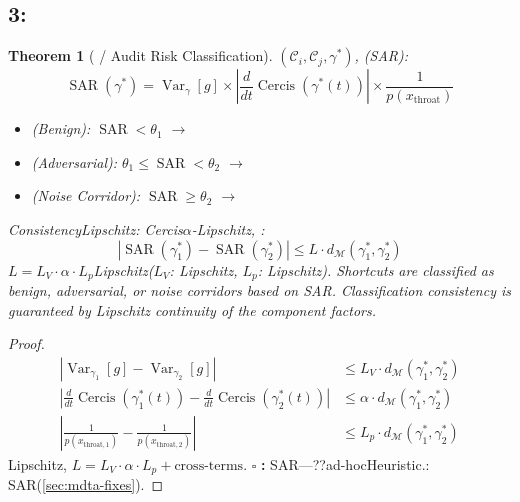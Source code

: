 \documentclass[11pt,a4paper]{article}
\theoremstyle{plain}
\newtheorem{theorem}{Theorem}[section]
\theoremstyle{definition}
\theoremstyle{remark}
\newcommand{\cM}{\mathcal{M}}
\newcommand{\cC}{\mathcal{C}}
\DeclareMathOperator{\Cercis}{Cercis}
\DeclareMathOperator{\Var}{Var}
\DeclareMathOperator{\SAR}{SAR}
\begin{document}
{\subsection{3:}
\begin{theorem}[ / Audit Risk Classification]
\label{thm:mdta-risk}
$(\cC_i, \cC_j, \gamma^*)$, (SAR): 
\begin{equation}
 \SAR(\gamma^*) = \Var_\gamma[g] \times \left|\frac{d}{dt} \Cercis(\gamma^*(t))\right| \times \frac{1}{p(x_{\text{throat}})}
\end{equation}
\begin{itemize}
 \item (Benign): $\SAR < \theta_1$ $\rightarrow$ 
 \item (Adversarial): $\theta_1 \leq \SAR < \theta_2$ $\rightarrow$ 
 \item (Noise Corridor): $\SAR \geq \theta_2$ $\rightarrow$ 
\end{itemize}
ConsistencyLipschitz: Cercis$\alpha$-Lipschitz, : 
\begin{equation}
\boxed{|\SAR(\gamma_1^*) - \SAR(\gamma_2^*)| \leq L \cdot d_{\cM}(\gamma_1^*, \gamma_2^*)}
\end{equation}
$L = L_V \cdot \alpha \cdot L_p$Lipschitz($L_V$: Lipschitz, $L_p$: Lipschitz).
\textit{Shortcuts are classified as benign, adversarial, or noise corridors based on SAR. Classification consistency is guaranteed by Lipschitz continuity of the component factors.}
\end{theorem}
\begin{proof}
\begin{align}
 |\Var_{\gamma_1}[g] - \Var_{\gamma_2}[g]| &\leq L_V \cdot d_{\cM}(\gamma_1^*, \gamma_2^*) \\
 \left|\frac{d}{dt}\Cercis(\gamma_1^*(t)) - \frac{d}{dt}\Cercis(\gamma_2^*(t))\right| &\leq \alpha \cdot d_{\cM}(\gamma_1^*, \gamma_2^*) \\
 \left|\frac{1}{p(x_{\text{throat},1})} - \frac{1}{p(x_{\text{throat},2})}\right| &\leq L_p \cdot d_{\cM}(\gamma_1^*, \gamma_2^*)
\end{align}
Lipschitz, $L = L_V \cdot \alpha \cdot L_p + \text{cross-terms}$.
$\square$ \textbf{: } SAR---??ad-hocHeuristic.: SAR(\ref{sec:mdta-fixes}).
\end{proof}
}
\end{document}

